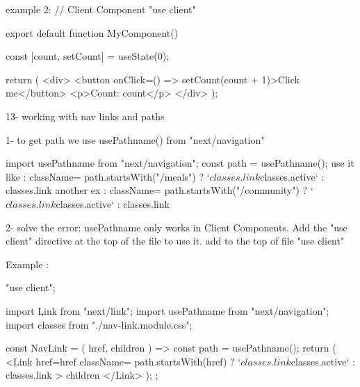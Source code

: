             example 2:
                    // Client Component
                    "use client"

                    export default function MyComponent() {
                    const [count, setCount] = useState(0);

                    return (
                        <div>
                        <button onClick={() => setCount(count + 1)}>Click me</button>
                        <p>Count: {count}</p>
                        </div>
                    );
                    }


13- working with nav links and paths
    
    1- to get path we use usePathname() from "next/navigation"

            import { usePathname } from "next/navigation";
            const path = usePathname();
            use it like : className={
                                path.startsWith("/meals")
                                ? `${classes.link} ${classes.active}`
                                : classes.link
                            }
            another ex : className={
                                path.startsWith("/community")
                                ? `${classes.link} ${classes.active}`
                                : classes.link
                            }

    2- solve the error:
        usePathname only works in Client Components. Add the "use client" directive at the top of the file to use it. 
        add to the top of file "use client"

        Example : 
        
                        "use client";

                        import Link from "next/link";
                        import { usePathname } from "next/navigation";
                        import classes from "./nav-link.module.css";

                        const NavLink = ({ href, children }) => {
                        const path = usePathname();
                        return (
                            <Link
                            href={href}
                            className={
                                path.startsWith(href)
                                ? `${classes.link} ${classes.active}`
                                : classes.link
                            }
                            >
                            {children}
                            </Link>
                        );
                        };

